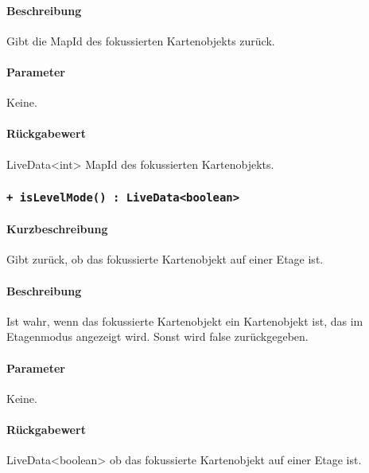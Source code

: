 \paragraph*{Beschreibung}
Gibt die MapId des fokussierten Kartenobjekts zurück.
\paragraph*{Parameter}
Keine.
\paragraph*{Rückgabewert}
LiveData<int> MapId des fokussierten Kartenobjekts.

\subsubsection*{\texttt{+ isLevelMode() : LiveData<boolean>}}%
\paragraph*{Kurzbeschreibung}
Gibt zurück, ob das fokussierte Kartenobjekt auf einer Etage ist.
\paragraph*{Beschreibung}
Ist wahr, wenn das fokussierte Kartenobjekt ein Kartenobjekt ist, das im Etagenmodus 
angezeigt wird. Sonst wird false zurückgegeben.
\paragraph*{Parameter}
Keine.
\paragraph*{Rückgabewert}
LiveData<boolean> ob das fokussierte Kartenobjekt auf einer Etage ist.